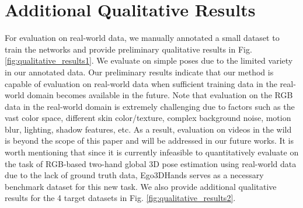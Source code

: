 \documentclass[10pt,twocolumn,letterpaper]{article}
\begin{document}
\section{Additional Qualitative Results}
\indent For evaluation on real-world data, we manually annotated a small dataset to train the networks and provide preliminary qualitative results in Fig. \ref{fig:qualitative_results1}. We evaluate on simple poses due to the limited variety in our annotated data. Our preliminary results indicate that our method is capable of evaluation on real-world data when sufficient training data in the real-world domain becomes available in the future. Note that evaluation on the RGB data in the real-world domain is extremely challenging due to factors such as the vast color space, different skin color/texture, complex background noise, motion blur, lighting, shadow features, etc. As a result, evaluation on videos in the wild is beyond the scope of this paper and will be addressed in our future works. It is worth mentioning that since it is currently infeasible to quantitatively evaluate on the task of RGB-based two-hand global 3D pose estimation using real-world data due to the lack of ground truth data, Ego3DHands serves as a necessary benchmark dataset for this new task. We also provide additional qualitative results for the 4 target datasets in Fig. \ref{fig:qualitative_results2}.
\setcounter{figure}{0}
\end{document}
